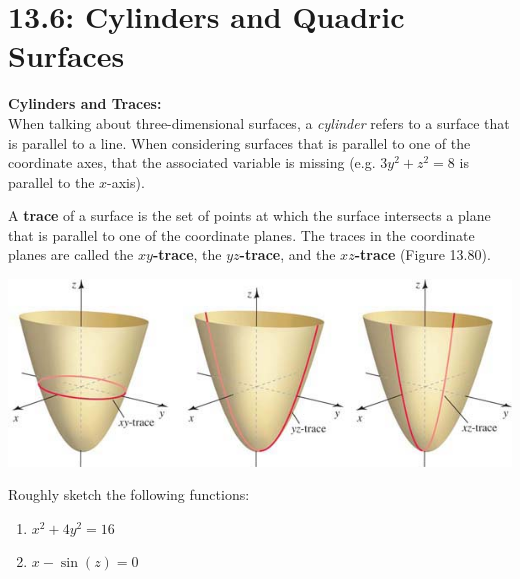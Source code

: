 \documentclass[../mathNotesPreamble]{subfiles}
\begin{document}
\section{13.6: Cylinders and Quadric Surfaces}
  \textbf{Cylinders and Traces:}\\
    When talking about three-dimensional surfaces, a \textit{cylinder} refers to a surface that is parallel to a line. When considering surfaces that is parallel to one of the coordinate axes, that the associated variable is missing (e.g. $3y^2+z^2=8$ is parallel to the $x$-axis).
  
  \begin{defn*}[Trace]
    A \textbf{trace} of a surface is the set of points at which the surface intersects a plane that is parallel to one of the coordinate planes. The traces in the coordinate planes are called the \textbf{$xy$-trace}, the \textbf{$yz$-trace}, and the \textbf{$xz$-trace} (Figure 13.80).
  \end{defn*}
  \begin{center}
    \includegraphics[width=0.7\linewidth]{../images/briggs_13_06/fig13_80}
  \end{center}

  \begin{ex*}
    Roughly sketch the following functions:
    \begin{enumerate}
      \item $x^2+4y^2=16$
      \item $x-\sin(z)=0$
    \end{enumerate}
  \end{ex*}
\end{document}
